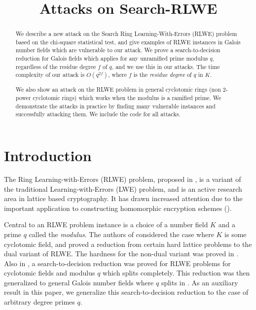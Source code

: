 \documentclass[envcountsame]{llncs}
\title{Attacks on Search-RLWE}
\begin{document}
\maketitle

\begin{abstract}
We describe a new attack on the Search Ring Learning-With-Errors (RLWE) problem based on the chi-square statistical test, and give examples of RLWE instances in Galois number fields which are vulnerable to our attack.  We prove a search-to-decision reduction  for Galois fields which applies for any unramified prime modulus $q$, regardless of the residue degree $f$ of $q$, and we use this in our attacks.
The time complexity of our attack is $O(q^{2f})$, where $f$ is the {\it residue degree} of $q$ in $K$.

We also show an attack on the RLWE problem in general cyclotomic rings (non $2$-power cyclotomic rings) which works when the modulus is a ramified prime.
We demonstrate the attacks in practice by finding many vulnerable instances and successfully attacking them.  We include the code for all attacks.

\end{abstract}

\section{Introduction}
The Ring Learning-with-Errors (RLWE) problem, proposed in \cite{lyubashevsky2013ideal}, is a variant of the traditional Learning-with-Errors (LWE) problem, and is an active research area in lattice based cryptography. It has drawn increased attention due to the important application  to constructing homomorphic encryption schemes (\cite{brakerski2011fully,brakerski2012leveled,brakerski2014efficient,gentry2012fully,stehle2011making,lopez2012fly,bos2013improved}).

Central to an RLWE problem instance is a choice of a number field $K$ and a prime $q$ called the {\it modulus}. The authors of \cite{lyubashevsky2013ideal} considered the case where $K$ is some cyclotomic field, and proved a reduction from certain hard lattice problems to the dual variant of RLWE. The hardness for the non-dual variant was proved in \cite{ducas2012ring}. Also in \cite{lyubashevsky2013ideal}, a search-to-decision reduction was proved for RLWE problems for cyclotomic fields and modulus $q$ which splits completely. This reduction was then generalized to general Galois number fields where $q$ splits in \cite{eisentrager2014weak}.  As an auxiliary result in this paper, we generalize this search-to-decision reduction to the case of arbitrary degree primes $q$.
\end{document}
